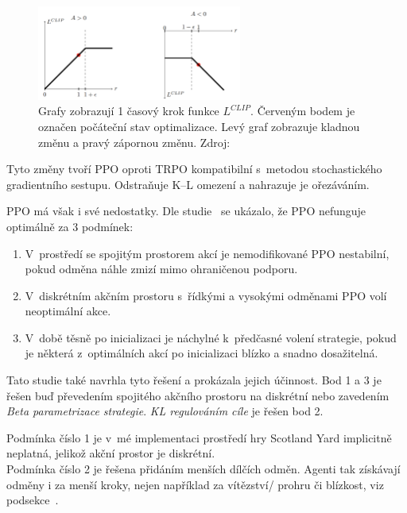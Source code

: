 \begin{figure}[H]
	\centering
	\includegraphics[width=0.6\textwidth]{obrazky-figures/clip}
	\caption{Grafy zobrazují 1 časový krok funkce $L^{CLIP}$.
  Červeným bodem je označen počáteční stav optimalizace.
  Levý graf zobrazuje kladnou změnu a pravý zápornou změnu.
  Zdroj:~\cite{RL_basics}}\label{fig:clip}
\end{figure}

Tyto změny tvoří PPO oproti TRPO kompatibilní s~metodou stochastického gradientního sestupu.
Odstraňuje K--L omezení a nahrazuje je ořezáváním.

PPO má však i své nedostatky.
\label{PPO_weakness}
Dle studie~\cite{PPO_weakness} se ukázalo, že PPO nefunguje optimálně za 3 podmínek:
\begin{enumerate}
  \item V~prostředí se spojitým prostorem akcí je nemodifikované PPO nestabilní, pokud odměna náhle zmizí mimo ohraničenou podporu.
  \item V~diskrétním akčním prostoru s~řídkými a vysokými odměnami PPO volí neoptimální akce.
  \item V~době těsně po inicializaci je náchylné k~předčasné volení strategie, pokud je některá z~optimálních akcí po inicializaci blízko a snadno dosažitelná.
\end{enumerate}

Tato studie také navrhla tyto řešení a prokázala jejich účinnost.
Bod 1 a 3 je řešen buď převedením spojitého akčního prostoru na diskrétní nebo zavedením \emph{Beta parametrizace strategie}.
\emph{KL regulováním cíle} je řešen bod 2.

Podmínka číslo 1 je v~mé implementaci prostředí hry Scotland Yard implicitně neplatná, jelikož akční prostor je diskrétní.\\
Podmínka číslo 2 je řešena přidáním menších dílčích odměn.
Agenti tak získávají odměny i za menší kroky, nejen například za vítězství/ prohru či blízkost, viz podsekce~.\\

